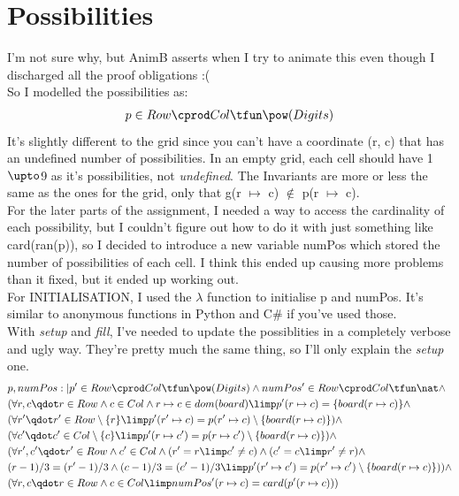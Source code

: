 \documentclass[a4paper]{article}
\begin{document}
\section{Possibilities}
I'm not sure why, but AnimB asserts when I try to animate this even though I discharged all the proof obligations :(\\
So I modelled the possibilities as:
\begin{align*}
 p \in  Row\cprod Col \tfun  \pow(Digits)
\end{align*}
It's slightly different to the grid since you can't have a coordinate (r, c) that has an undefined number of possibilities. In an empty grid, each cell should have 1$\upto$9 as it's possibilities, not \textit{undefined}. The Invariants are more or less the same as the ones for the grid, only that g(r $\mapsto$ c) $\notin$ p(r $\mapsto$ c). \\
For the later parts of the assignment, I needed a way to access the cardinality of each possibility, but I couldn't figure out how to do it with just something like card(ran(p)), so I decided to introduce a new variable numPos which stored the number of possibilities of each cell. I think this ended up causing more problems than it fixed, but it ended up working out.\\
For INITIALISATION, I used the $\lambda$ function to initialise p and numPos. It's similar to anonymous functions in Python and C\# if you've used those.\\
With \textit{setup} and \textit{fill}, I've needed to update the possiblities in a completely verbose and ugly way. They're pretty much the same thing, so I'll only explain the \textit{setup} one.
\begin{align*}
&p, numPos :|  p' \in  Row\cprod Col \tfun  \pow(Digits) \land  numPos' \in  Row\cprod Col \tfun  \nat \land\\
&(\forall  r, c \qdot  r \in  Row \land  c \in  Col \land  r \mapsto  c \in  dom(board) \limp  p'(r \mapsto  c) = \{ board(r \mapsto  c)\}  \land \\
&(\forall  r' \qdot  r' \in  Row\setminus \{ r\}  \limp  p'(r' \mapsto  c) = p(r' \mapsto  c)\setminus \{ board(r \mapsto  c)\} ) \land\\
&(\forall  c' \qdot  c' \in  Col\setminus \{ c\}  \limp  p'(r \mapsto  c') = p(r \mapsto  c')\setminus \{ board(r \mapsto  c)\} ) \land \\
&(\forall  r', c' \qdot  r' \in  Row \land  c' \in  Col \land  (r' = r \limp  c' \neq  c) \land  (c' = c \limp  r' \neq  r) \land \\
&(r- 1)/ 3 = (r'- 1)/ 3 \land  (c- 1)/ 3 = (c'- 1)/ 3 \limp  p'(r' \mapsto  c') = p(r' \mapsto  c')\setminus \{ board(r \mapsto  c)\} )) \land \\
&(\forall  r, c \qdot  r \in  Row \land  c \in  Col \limp  numPos'(r \mapsto  c) = card(p'(r \mapsto  c)))
\end{align*}
\end{document}
